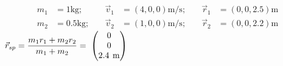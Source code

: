 \documentclass{alex_hü}
\begin{document}
\renewcommand{\labelenumi}{\alph{enumi})}


\begin{align*}
	m_1 &= 1 \si{\kg};\quad &\vec{v}_1 &= \left(4, 0, 0\right) \si{\m\per\s};\quad &\vec{r}_1 &= \left(0, 0, 2.5\right)\si{\m}  \\
	m_2 &= 0.5 \si{\kg};\quad  &\vec{v}_2 &= \left(1, 0, 0\right)\si{\m\per\s};\quad &\vec{r}_2 &= \left(0, 0, 2.2\right)\si{\m} 
\end{align*}
	\centering \( \vec{r}_{sp} = \dfrac{m_1r_1 + m_2r_2}{m_1 + m_2} = \vector{0\\ 0\\ 2.4\si{\m}}\) \\
	
\end{document}

